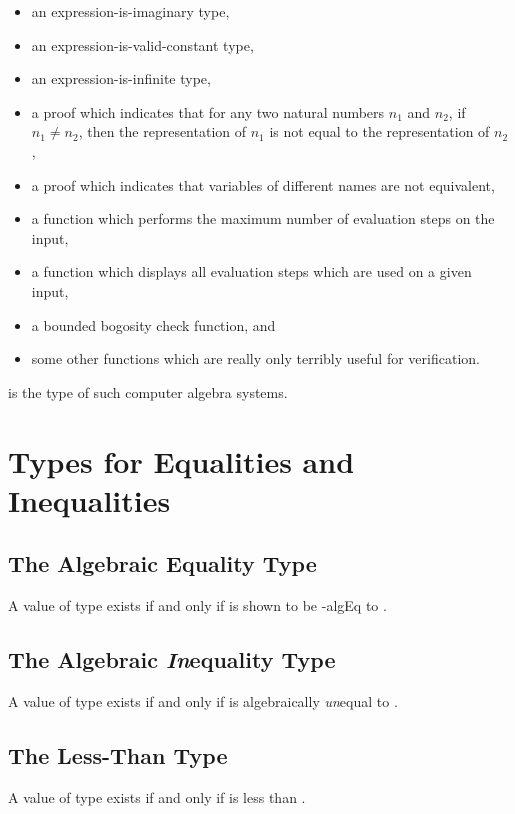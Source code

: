 \documentclass{report}
\begin{document}
\begin{itemize}
  \item an expression-is-imaginary type,
  \item an expression-is-valid-constant type,
  \item an expression-is-infinite type,
  \item a proof which indicates that for any two natural numbers \(n_1\) and \(n_2\), if \(n_1 \neq n_2\), then the representation of \(n_1\) is not equal to the representation of \(n_2\),
  \item a proof which indicates that variables of different names are not equivalent,
  \item a function which performs the maximum number of evaluation steps on the input,
  \item a function which displays all evaluation steps which are used on a given input,
  \item a bounded bogosity check function, and
  \item some other functions which are really only terribly useful for verification.
\end{itemize}

 is the type of such computer algebra systems.

\section{Types for Equalities and Inequalities}

\subsection{The Algebraic Equality Type}
A value of type     exists if and only if  is shown to be -\gls{algEq} to .

\subsection{The Algebraic \emph{In}equality Type}
A value of type     exists if and only if  is algebraically \emph{un}equal to .

\subsection{The Less-Than Type}
A value of type    exists if and only if  is less than .
\end{document}
